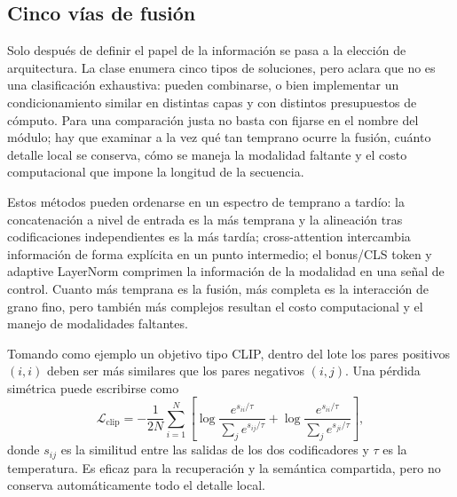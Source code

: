 \subsection{Cinco vías de fusión}

Solo después de definir el papel de la información se pasa a la elección de arquitectura. La clase enumera cinco tipos de soluciones, pero aclara que no es una clasificación exhaustiva: pueden combinarse, o bien implementar un condicionamiento similar en distintas capas y con distintos presupuestos de cómputo. Para una comparación justa no basta con fijarse en el nombre del módulo; hay que examinar a la vez qué tan temprano ocurre la fusión, cuánto detalle local se conserva, cómo se maneja la modalidad faltante y el costo computacional que impone la longitud de la secuencia.


Estos métodos pueden ordenarse en un espectro de temprano a tardío: la concatenación a nivel de entrada es la más temprana y la alineación tras codificaciones independientes es la más tardía; cross-attention intercambia información de forma explícita en un punto intermedio; el bonus/CLS token y adaptive LayerNorm comprimen la información de la modalidad en una señal de control. Cuanto más temprana es la fusión, más completa es la interacción de grano fino, pero también más complejos resultan el costo computacional y el manejo de modalidades faltantes.


Tomando como ejemplo un objetivo tipo CLIP, dentro del lote los pares positivos $(i,i)$ deben ser más similares que los pares negativos $(i,j)$. Una pérdida simétrica puede escribirse como
\[
\mathcal{L}_{\mathrm{clip}}
=-\frac{1}{2N}\sum_{i=1}^{N}\left[
\log\frac{e^{s_{ii}/\tau}}{\sum_j e^{s_{ij}/\tau}}
+\log\frac{e^{s_{ii}/\tau}}{\sum_j e^{s_{ji}/\tau}}
\right],
\]
donde $s_{ij}$ es la similitud entre las salidas de los dos codificadores y $\tau$ es la temperatura. Es eficaz para la recuperación y la semántica compartida, pero no conserva automáticamente todo el detalle local.


